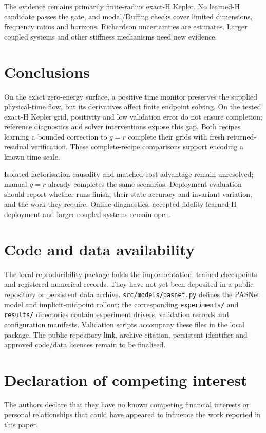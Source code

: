 \documentclass[final,3p,times]{elsarticle}
\begin{document}
The evidence remains primarily finite-radius exact-H Kepler. No learned-H
candidate passes the gate, and modal/Duffing checks cover limited
dimensions, frequency ratios and horizons. Richardson uncertainties are
estimates. Larger coupled systems and other stiffness mechanisms need
new evidence.

\section{Conclusions}
\label{sec:conclusions}

On the exact zero-energy surface, a positive time monitor preserves the
supplied physical-time flow, but its derivatives affect finite endpoint
solving. On the tested exact-H Kepler grid, positivity and low validation
error do not ensure completion; reference diagnostics and solver
interventions expose this gap. Both recipes learning a bounded correction
to $g=r$ complete their grids with fresh returned-residual verification.
These complete-recipe comparisons support encoding a known time scale.

Isolated factorisation causality and matched-cost advantage remain
unresolved; manual $g=r$ already completes the same scenarios. Deployment
evaluation should report whether runs finish, their state accuracy and
invariant variation, and the work they require. Online diagnostics,
accepted-fidelity learned-H deployment and larger coupled systems
remain open.

\section*{Code and data availability}
The local reproducibility package holds the implementation, trained
checkpoints and registered numerical records. They have not yet been
deposited in a public repository or persistent data archive.
\texttt{src/models/pasnet.py} defines the PASNet model and implicit-midpoint
rollout; the corresponding \texttt{experiments/}
and \texttt{results/} directories contain experiment drivers, validation
records and configuration manifests. Validation scripts accompany
these files in the local package. The public repository link, archive
citation, persistent identifier and approved code/data licences remain
to be finalised.



\section*{Declaration of competing interest}
The authors declare that they have no known competing financial interests
or personal relationships that could have appeared to influence the work
reported in this paper.
\end{document}
